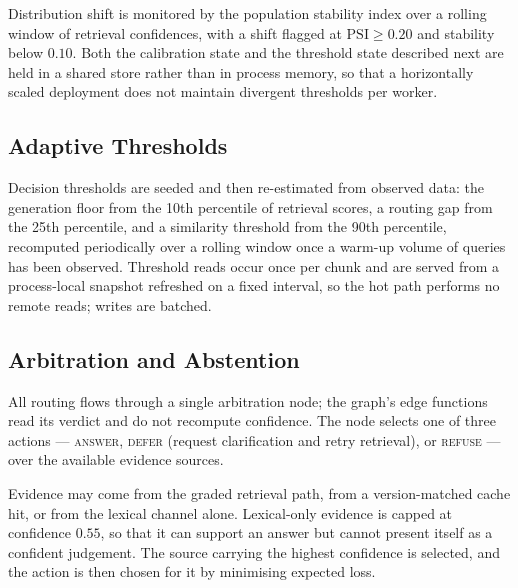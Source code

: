 \documentclass[conference]{IEEEtran}
\begin{document}
Distribution shift is monitored by the population stability index over a
rolling window of retrieval confidences, with a shift flagged at
$\mathrm{PSI}\ge0.20$ and stability below $0.10$. Both the calibration state
and the threshold state described next are held in a shared store rather than
in process memory, so that a horizontally scaled deployment does not maintain
divergent thresholds per worker.

\subsection{Adaptive Thresholds}
Decision thresholds are seeded and then re-estimated from observed data:
the generation floor from the 10th percentile of retrieval scores, a routing
gap from the 25th percentile, and a similarity threshold from the 90th
percentile, recomputed periodically over a rolling window once a warm-up
volume of queries has been observed. Threshold reads occur once per chunk and
are served from a process-local snapshot refreshed on a fixed interval, so the
hot path performs no remote reads; writes are batched.

\subsection{Arbitration and Abstention}
\label{sec:abstain}
All routing flows through a single arbitration node; the graph's edge functions
read its verdict and do not recompute confidence. The node selects one of three
actions --- \textsc{answer}, \textsc{defer} (request clarification and retry
retrieval), or \textsc{refuse} --- over the available evidence sources.

Evidence may come from the graded retrieval path, from a version-matched cache
hit, or from the lexical channel alone. Lexical-only evidence is capped at
confidence $0.55$, so that it can support an answer but cannot present itself as
a confident judgement. The source carrying the highest confidence is selected,
and the action is then chosen for it by minimising expected loss.
\end{document}
